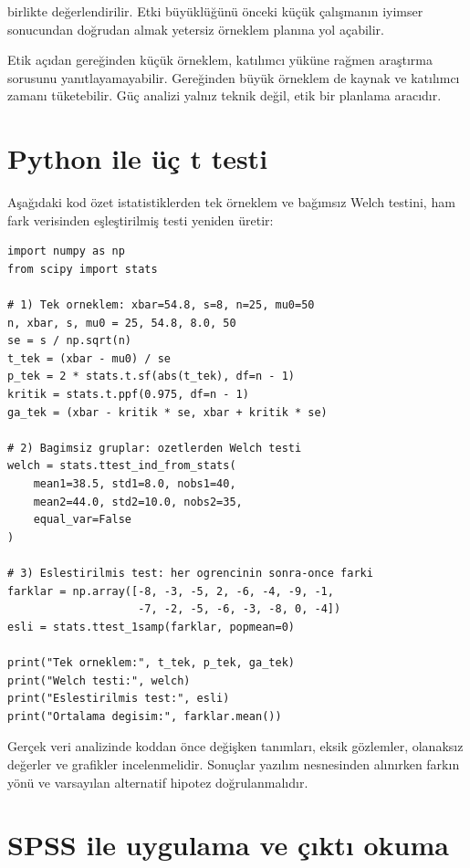 birlikte değerlendirilir. Etki büyüklüğünü önceki küçük çalışmanın iyimser
sonucundan doğrudan almak yetersiz örneklem planına yol açabilir.

\begin{researchbox}
Etik açıdan gereğinden küçük örneklem, katılımcı yüküne rağmen araştırma
sorusunu yanıtlayamayabilir. Gereğinden büyük örneklem de kaynak ve katılımcı
zamanı tüketebilir. Güç analizi yalnız teknik değil, etik bir planlama
aracıdır.
\end{researchbox}

\section{Python ile üç t testi}

Aşağıdaki kod özet istatistiklerden tek örneklem ve bağımsız Welch testini,
ham fark verisinden eşleştirilmiş testi yeniden üretir:

\begin{lstlisting}
import numpy as np
from scipy import stats

# 1) Tek orneklem: xbar=54.8, s=8, n=25, mu0=50
n, xbar, s, mu0 = 25, 54.8, 8.0, 50
se = s / np.sqrt(n)
t_tek = (xbar - mu0) / se
p_tek = 2 * stats.t.sf(abs(t_tek), df=n - 1)
kritik = stats.t.ppf(0.975, df=n - 1)
ga_tek = (xbar - kritik * se, xbar + kritik * se)

# 2) Bagimsiz gruplar: ozetlerden Welch testi
welch = stats.ttest_ind_from_stats(
    mean1=38.5, std1=8.0, nobs1=40,
    mean2=44.0, std2=10.0, nobs2=35,
    equal_var=False
)

# 3) Eslestirilmis test: her ogrencinin sonra-once farki
farklar = np.array([-8, -3, -5, 2, -6, -4, -9, -1,
                    -7, -2, -5, -6, -3, -8, 0, -4])
esli = stats.ttest_1samp(farklar, popmean=0)

print("Tek orneklem:", t_tek, p_tek, ga_tek)
print("Welch testi:", welch)
print("Eslestirilmis test:", esli)
print("Ortalama degisim:", farklar.mean())
\end{lstlisting}

Gerçek veri analizinde koddan önce değişken tanımları, eksik gözlemler,
olanaksız değerler ve grafikler incelenmelidir. Sonuçlar yazılım nesnesinden
alınırken farkın yönü ve varsayılan alternatif hipotez doğrulanmalıdır.

\section{SPSS ile uygulama ve çıktı okuma}

